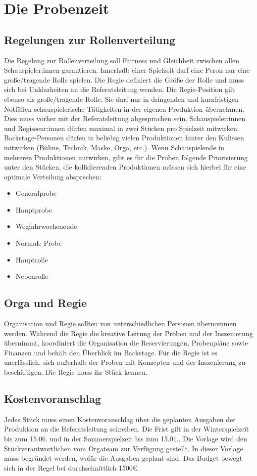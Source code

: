 \section{Die Probenzeit}
\subsection{Regelungen zur Rollenverteilung}
Die Regelung zur Rollenverteilung soll Fairness und Gleichheit zwischen allen Schauspieler:innen garantieren. 	
Innerhalb einer Spielzeit darf eine Peron nur eine große/tragende Rolle spielen. Die Regie definiert die Größe der Rolle und muss sich bei Unklarheiten an die Referatsleitung wenden.	
Die Regie-Position gilt ebenso als große/tragende Rolle. Sie darf nur in dringenden und kurzfristigen Notfällen schauspielerische Tätigkeiten in der eigenen Produktion übernehmen. Dies muss vorher mit der Referatsleitung abgesprochen sein.	
Schauspieler:innen und Regisseur:innen dürfen maximal in zwei Stücken pro Spielzeit mitwirken. 
Backstage-Personen dürfen in beliebig vielen Produktionen hinter den Kulissen mitwirken (Bühne, Technik, Maske, Orga, etc.).
Wenn Schauspielende in mehreren Produktionen mitwirken, gibt es für die Proben folgende Priorisierung unter den Stücken, die kollidierenden Produktionen müssen sich hierbei für eine optimale Verteilung absprechen:
\begin{itemize}
    \item Generalprobe
    \item Hauptprobe
    \item Wegfahrwochenende
    \item Normale Probe
    \item Hauptrolle
    \item Nebenrolle
\end{itemize}

\subsection{Orga und Regie}
Organisation und Regie sollten von unterschiedlichen Personen übernommen werden. Während die Regie die kreative Leitung der Proben und der Inszenierung übernimmt, koordiniert die Organisation die Reservierungen, Probenpläne sowie Finanzen und behält den Überblick im Backstage. 	
Für die Regie ist es unerlässlich, sich außerhalb der Proben mit Konzepten und der Inszenierung zu beschäftigen. Die Regie muss ihr Stück kennen.

\subsection{Kostenvoranschlag}
Jedes Stück muss einen Kostenvoranschlag über die geplanten Ausgaben der Produktion an die Referatsleitung schreiben. Die Frist gilt in der Winterspielzeit bis zum 15.06. und in der Sommerspielzeit bis zum 15.01..	
Die Vorlage wird den Stückverantwortlichen vom Orgateam zur Verfügung gestellt. In dieser Vorlage muss begründet werden, wofür die Ausgaben geplant sind. Das Budget bewegt sich in der Regel bei durchschnittlich 1500€. 

